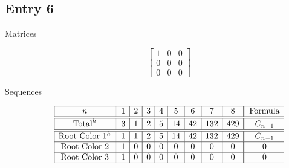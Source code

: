 \documentclass[12pt]{amsart}
\begin{document}
\subsection*{Entry 6}
\begin{description}
    \item[Matrices]
    
    \[\begin{bmatrix}
1 & 0 & 0 \\
0 & 0 & 0 \\
0 & 0 & 0
\end{bmatrix}\]
    \item[Sequences]\hspace*{\fill}\vspace{-0.5cm}
    \begin{center}
        \[
        \begin{array}{|c||c|c|c|c|c|c|c|c||c|}\hline
           n  & 1 & 2 & 3 & 4 & 5 & 6 & 7 & 8  & \text{Formula}\\\hline\hline
           \text{Total}^h  & 3 & 1 & 2 & 5 & 14 & 42 & 132 & 429 & C_{n-1}\\\hline\hline
           \text{Root Color }1^h & 1 & 1 & 2 & 5 & 14 & 42 & 132 & 429 & C_{n-1}\\\hline
           \text{Root Color }2 & 1 & 0 & 0 & 0 & 0 & 0 & 0 & 0 & 0\\\hline
           \text{Root Color }3 & 1 & 0 & 0 & 0 & 0 & 0 & 0 & 0 & 0\\\hline
        \end{array}
        \]
    \end{center}
    
    
    
\end{description}
\end{document}
